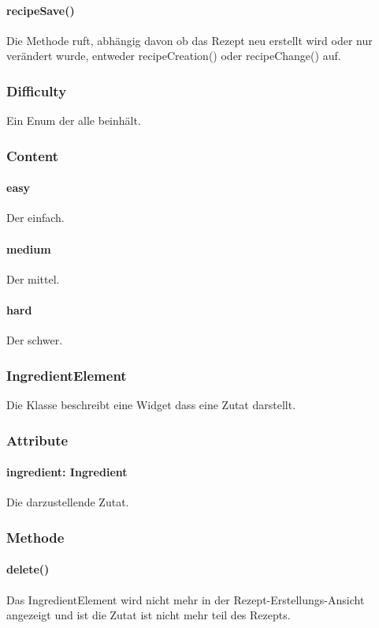 \documentclass[parskip=full]{scrartcl}
\begin{document}
\paragraph*{recipeSave()} Die Methode ruft, abhängig davon ob das Rezept neu erstellt wird oder nur verändert wurde, entweder recipeCreation() oder recipeChange() auf.

\subsubsection{Difficulty}
Ein Enum der alle  beinhält.
\subsubsection*{Content}
\paragraph*{easy} Der  einfach.
\paragraph*{medium} Der  mittel.
\paragraph*{hard} Der  schwer.

\subsubsection*{IngredientElement}
Die Klasse beschreibt eine Widget dass eine Zutat darstellt.
\subsubsection*{Attribute}
\paragraph*{ingredient: Ingredient} Die darzustellende Zutat.

\subsubsection*{Methode}
\paragraph*{delete()} Das IngredientElement wird nicht mehr in der Rezept-Erstellungs-Ansicht angezeigt und ist die Zutat ist nicht mehr teil des Rezepts.
\end{document}
